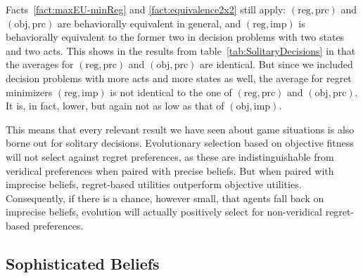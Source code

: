 \documentclass[fleqn,reqno,12pt]{article}
\theoremstyle{Satz}
\theoremstyle{Bsp}
\begin{document}
Facts~\ref{fact:maxEU-minReg} and \ref{fact:equivalence2x2} still apply:
$(\text{reg}, \text{prc})$ and $(\text{obj}, \text{prc})$ are behaviorally equivalent in
general, and $(\text{reg}, \text{imp})$ is behaviorally equivalent to the former two in
decision problems with two states and two acts. This shows in the results from
table~\ref{tab:SolitaryDecisions} in that the averages for $(\text{reg}, \text{prc})$ and
$(\text{obj}, \text{prc})$ are identical. But since we included decision problems with more
acts and more states as well, the average for regret minimizers $(\text{reg}, \text{imp})$ is
not identical to the one of $(\text{reg}, \text{prc})$ and $(\text{obj}, \text{prc})$. It
is, in fact, lower, but again not as low as that of $(\text{obj}, \text{imp})$.

This means that every relevant result we have seen about game situations is also borne out for
solitary decisions. Evolutionary selection based on objective fitness will not select against
regret preferences, as these are indistinguishable from veridical preferences
when paired with precise beliefs. But when paired with imprecise beliefs, regret-based
utilities outperform objective utilities. Consequently, if there is a chance, however
small, that agents fall back on imprecise beliefs, evolution will actually positively select
for non-veridical regret-based preferences.


\subsection{Sophisticated Beliefs}
\end{document}
